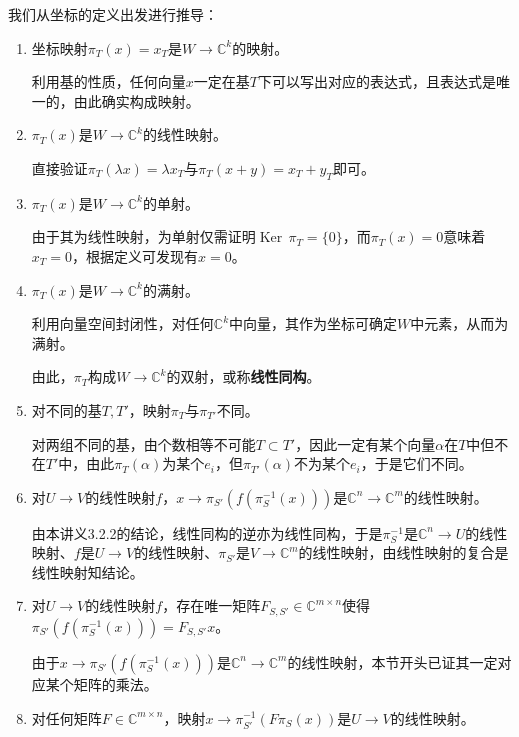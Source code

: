 \documentclass[a4paper,UTF8,fontset=windows]{ctexart}
\DeclareMathOperator{\Ker}{Ker\,}
\newcommand*{\note}{\noindent *}
\begin{document}
我们从坐标的定义出发进行推导：
\begin{enumerate}
    \item 坐标映射$\pi_T(x)=x_T$是$W\to\mathbb{C}^k$的映射。
    
    利用基的性质，任何向量$x$一定在基$T$下可以写出对应的表达式，且表达式是唯一的，由此确实构成映射。
    
    \item $\pi_T(x)$是$W\to\mathbb{C}^k$的线性映射。
    
    直接验证$\pi_T(\lambda x)=\lambda x_T$与$\pi_T(x+y)=x_T+y_T$即可。
    
    \item $\pi_T(x)$是$W\to\mathbb{C}^k$的单射。
    
    由于其为线性映射，为单射仅需证明$\Ker\pi_T=\{0\}$，而$\pi_T(x)=0$意味着$x_T=0$，根据定义可发现有$x=0$。

    \item $\pi_T(x)$是$W\to\mathbb{C}^k$的满射。
    
    利用向量空间封闭性，对任何$\mathbb{C}^k$中向量，其作为坐标可确定$W$中元素，从而为满射。

    \note 由此，$\pi_T$构成$W\to\mathbb{C}^k$的双射，或称\textbf{线性同构}。
    
    \item 对不同的基$T,T'$，映射$\pi_T$与$\pi_{T'}$不同。
    
    对两组不同的基，由个数相等不可能$T\subset T'$，因此一定有某个向量$\alpha$在$T$中但不在$T'$中，由此$\pi_T(\alpha)$为某个$e_i$，但$\pi_{T'}(\alpha)$不为某个$e_i$，于是它们不同。
    
    \item 对$U\to V$的线性映射$f$，$x\to\pi_{S'}(f(\pi_S^{-1}(x)))$是$\mathbb{C}^n\to\mathbb{C}^m$的线性映射。
    
    由本讲义3.2.2的结论，线性同构的逆亦为线性同构，于是$\pi_S^{-1}$是$\mathbb{C}^n\to U$的线性映射、$f$是$U\to V$的线性映射、$\pi_{S'}$是$V\to\mathbb{C}^m$的线性映射，由线性映射的复合是线性映射知结论。
    
    \item 对$U\to V$的线性映射$f$，存在唯一矩阵$F_{S,S'}\in\mathbb{C}^{m\times n}$使得$\pi_{S'}(f(\pi_S^{-1}(x)))=F_{S,S'}x$。
    
    由于$x\to\pi_{S'}(f(\pi_S^{-1}(x)))$是$\mathbb{C}^n\to\mathbb{C}^m$的线性映射，本节开头已证其一定对应某个矩阵的乘法。
    
    \item 对任何矩阵$F\in\mathbb{C}^{m\times n}$，映射$x\to\pi_{S'}^{-1}(F\pi_S(x))$是$U\to V$的线性映射。
    

\end{enumerate}
\end{document}

